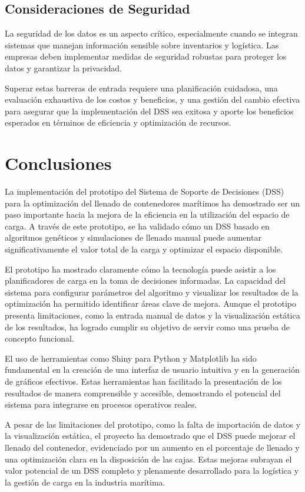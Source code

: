 \documentclass[9pt,a4paper]{rho}
\begin{document}
\subsection{Consideraciones de Seguridad}
La seguridad de los datos es un aspecto crítico, especialmente cuando se integran sistemas que manejan información sensible sobre inventarios y logística. Las empresas deben implementar medidas de seguridad robustas para proteger los datos y garantizar la privacidad.

Superar estas barreras de entrada requiere una planificación cuidadosa, una evaluación exhaustiva de los costos y beneficios, y una gestión del cambio efectiva para asegurar que la implementación del DSS sea exitosa y aporte los beneficios esperados en términos de eficiencia y optimización de recursos.

\section{Conclusiones}
La implementación del prototipo del Sistema de Soporte de Decisiones (DSS) para la optimización del llenado de contenedores marítimos ha demostrado ser un paso importante hacia la mejora de la eficiencia en la utilización del espacio de carga. A través de este prototipo, se ha validado cómo un DSS basado en algoritmos genéticos y simulaciones de llenado manual puede aumentar significativamente el valor total de la carga y optimizar el espacio disponible.

El prototipo ha mostrado claramente cómo la tecnología puede asistir a los planificadores de carga en la toma de decisiones informadas. La capacidad del sistema para configurar parámetros del algoritmo y visualizar los resultados de la optimización ha permitido identificar áreas clave de mejora. Aunque el prototipo presenta limitaciones, como la entrada manual de datos y la visualización estática de los resultados, ha logrado cumplir su objetivo de servir como una prueba de concepto funcional.

El uso de herramientas como Shiny para Python y Matplotlib ha sido fundamental en la creación de una interfaz de usuario intuitiva y en la generación de gráficos efectivos. Estas herramientas han facilitado la presentación de los resultados de manera comprensible y accesible, demostrando el potencial del sistema para integrarse en procesos operativos reales.

A pesar de las limitaciones del prototipo, como la falta de importación de datos y la visualización estática, el proyecto ha demostrado que el DSS puede mejorar el llenado del contenedor, evidenciado por un aumento en el porcentaje de llenado y una optimización clara en la disposición de las cajas. Estas mejoras subrayan el valor potencial de un DSS completo y plenamente desarrollado para la logística y la gestión de carga en la industria marítima.
\end{document}
